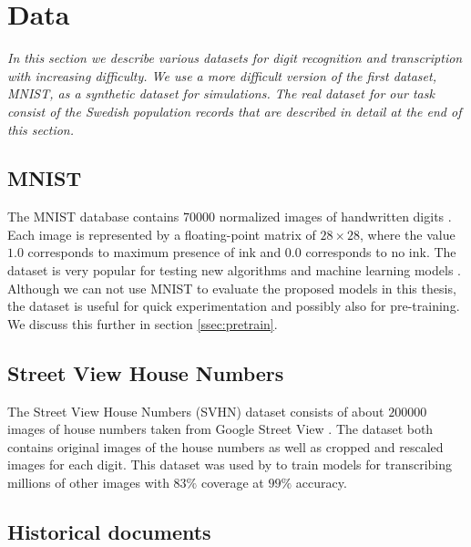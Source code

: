 \section{Data}

\textit{In this section we describe various datasets for digit recognition and transcription with increasing difficulty. We use a more difficult version of the first dataset, MNIST, as a synthetic dataset for simulations. The real dataset for our task consist of the Swedish population records that are described in detail at the end of this section.}


\subsection{MNIST}

The MNIST database contains $70000$ normalized images of handwritten digits \cite{MNIST_orig}.
Each image is represented by a floating-point matrix of $28 \times 28$, where the value $1.0$ corresponds to maximum presence of ink and $0.0$ corresponds to no ink.
The dataset is very popular for testing new algorithms and machine learning models \cite{MNIST}.
Although we can not use MNIST to evaluate the proposed models in this thesis, the dataset is useful for quick experimentation and possibly also for pre-training. We discuss this further in section \ref{ssec:pretrain}.

\subsection{Street View House Numbers}

The Street View House Numbers (SVHN) dataset consists of about $200000$ images of house numbers taken from Google Street View \cite{SVHN}. The dataset both contains original images of the house numbers as well as cropped and rescaled images for each digit. This dataset was used by \textcite{multidigit_streetview} to train models for transcribing millions of other images with $83\%$ coverage at $99\%$ accuracy.

\subsection{Historical documents}

